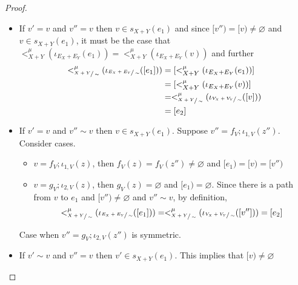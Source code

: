 \begin{proof}
\begin{itemize}
\begin{itemize}
                    \item If $v' = v$ and $v'' = v$ then $v \in s_{X+Y}(e_1)$ and since $[v'') = [v) \not = \varnothing$ and $v \in s_{X+Y}(e_1)$, it must be the case that
                    $<_{X+Y}^{\mu}(\iota_{E_{X} + E_{Y}}(e_1)) = <_{X+Y}^{\mu}(\iota_{E_{X} + E_{Y}}(v))$ and further
                    \begin{align*}
                    <_{\sfrac{X+Y}{\sim}}^{\mu}(\iota_{\sfrac{E_{X} + E_{Y}}{\sim}}([e_1])) &= [<_{X+Y}^{\mu}(\iota_{E_{X} + E_{Y}}(e_1))]\\
                                                                                            &= [<_{X+Y}^{\mu}(\iota_{E_{X} + E_{Y}}(v))]\\
                                                                                            &= <_{\sfrac{X+Y}{\sim}}^{\mu}(\iota_{\sfrac{V_{X} + V_{Y}}{\sim}}([v]))\\
                                                                                            &= [e_2]
                    \end{align*}
                    \item If $v' = v $ and $v'' \sim v$ then $v \in s_{X+Y}(e_1)$.
                          Suppose $v'' = f_{V};\iota_{1,V}(z'')$.
                          Consider cases.
                          \begin{itemize}
                            \item $v = f_{V};\iota_{1,V}(z)$, then $f_{V}(z) = f_{V}(z'') \not = \varnothing$ and $[e_1) = [v) = [v'')$
                            \item $v = g_{V};\iota_{2,V}(z)$, then $g_{V}(z) = \varnothing$ and $[e_1) = \varnothing$.
                                  Since there is a path from $v$ to $e_1$ and $[v'') \not = \varnothing$ and $v'' \sim v$, by definition,
                                  \begin{align*}
                                    <_{\sfrac{X+Y}{\sim}}^{\mu}(\iota_{\sfrac{E_{X} + E_{Y}}{\sim}}([e_1])) = <_{\sfrac{X+Y}{\sim}}^{\mu}(\iota_{\sfrac{V_{X} + V_{Y}}{\sim}}([v''])) = [e_2]
                                  \end{align*}
                          \end{itemize}
                          Case when $v'' = g_{V};\iota_{2,V}(z'')$ is symmetric.
                    \item If $v' \sim v$ and $v'' = v$ then $v' \in s_{X+Y}(e_1)$. This implies that $[v) \not = \varnothing$

\end{itemize}
\end{itemize}
\end{proof}
